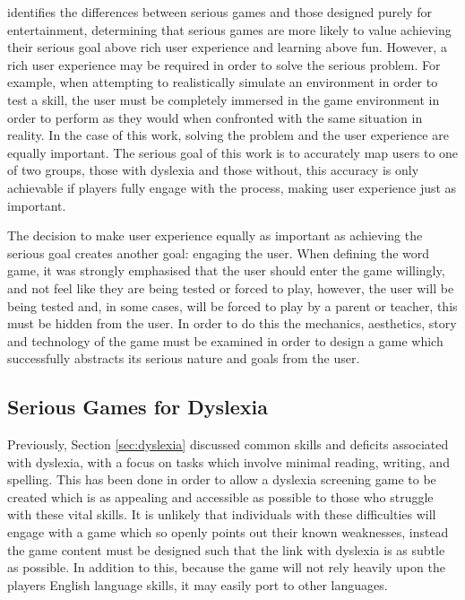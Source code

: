 \documentclass[journal]{IEEEtran}
\begin{document}
\cite{SeriousOverview} identifies the differences between serious games and those designed purely for entertainment, determining that serious games are more likely to value achieving their serious goal above rich user experience and learning above fun. However, a rich user experience may be required in order to solve the serious problem.
For example, when attempting to realistically simulate an environment in order to test a skill, the user must be completely immersed in the game environment in order to perform as they would when confronted with the same situation in reality. 
In the case of this work, solving the problem and the user experience are equally important. The serious goal of this work is to accurately map users to one of two groups, those with dyslexia and those without, this accuracy is only achievable if players fully engage with the process, making user experience just as important. 

The decision to make user experience equally as important as achieving the serious goal creates another goal: engaging the user. When defining the word game, it was strongly emphasised that the user should enter the game willingly, and not feel like they are being tested or forced to play, however, the user will be being tested and, in some cases, will be forced to play by a parent or teacher, this must be hidden from the user.
In order to do this the mechanics, aesthetics, story and technology of the game must be examined in order to design a game which successfully abstracts its serious nature and goals from the user.

\subsection{Serious Games for Dyslexia}
Previously, Section \ref{sec:dyslexia} discussed common skills and deficits associated with dyslexia, with a focus on tasks which involve minimal reading, writing, and spelling. This has been done in order to allow a dyslexia screening game to be created which is as appealing and accessible as possible to those who struggle with these vital skills. It is unlikely that individuals with these difficulties will engage with a game which so openly points out their known weaknesses, instead the game content must be designed such that the link with dyslexia is as subtle as possible. In addition to this, because the game will not rely  heavily upon the players English language skills, it may easily port to other languages.
\end{document}
